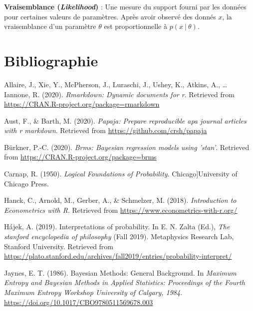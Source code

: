 \documentclass[
  a4paper,11pt,twoside,onecolumn,openright,final,oldfontcommands]{memoir}
\newlength{\cslhangindent}
\newenvironment{cslreferences}%
  {\setlength{\parindent}{0pt}%
  \everypar{\setlength{\hangindent}{\cslhangindent}}\ignorespaces}%
  {\par}
\theoremstyle{definition}
\theoremstyle{definition}
\theoremstyle{definition}
\theoremstyle{remark}
\begin{document}
\textbf{Vraisemblance (\emph{Likelihood})} : Une mesure du support fourni par les données pour certaines valeurs de paramètres. Après avoir observé des donnés \(x\), la vraisemblance d'un paramètre \(\theta\) est proportionnelle à \(p(x \ | \ \theta)\).

\hypertarget{bibliographie}{%
\chapter*{Bibliographie}\label{bibliographie}}


\setlength{\parindent}{-0.5in}
\setlength{\parskip}{8pt}

\hypertarget{refs}{}
\begin{cslreferences}
\leavevmode\hypertarget{ref-R-rmarkdown}{}%
Allaire, J., Xie, Y., McPherson, J., Luraschi, J., Ushey, K., Atkins, A., \ldots{} Iannone, R. (2020). \emph{Rmarkdown: Dynamic documents for r}. Retrieved from \url{https://CRAN.R-project.org/package=rmarkdown}

\leavevmode\hypertarget{ref-R-papaja}{}%
Aust, F., \& Barth, M. (2020). \emph{Papaja: Prepare reproducible apa journal articles with r markdown}. Retrieved from \url{https://github.com/crsh/papaja}

\leavevmode\hypertarget{ref-R-brms}{}%
Bürkner, P.-C. (2020). \emph{Brms: Bayesian regression models using 'stan'}. Retrieved from \url{https://CRAN.R-project.org/package=brms}

\leavevmode\hypertarget{ref-carnap_logical_1950}{}%
Carnap, R. (1950). \emph{Logical Foundations of Probability}. Chicago{]}University of Chicago Press.

\leavevmode\hypertarget{ref-hanck_introduction_2018}{}%
Hanck, C., Arnold, M., Gerber, A., \& Schmelzer, M. (2018). \emph{Introduction to Econometrics with R}. Retrieved from \url{https://www.econometrics-with-r.org/}

\leavevmode\hypertarget{ref-sep-probability-interpret}{}%
Hájek, A. (2019). Interpretations of probability. In E. N. Zalta (Ed.), \emph{The stanford encyclopedia of philosophy} (Fall 2019). Metaphysics Research Lab, Stanford University. Retrieved from \url{https://plato.stanford.edu/archives/fall2019/entries/probability-interpret/}

\leavevmode\hypertarget{ref-jaynes_bayesian_1986}{}%
Jaynes, E. T. (1986). Bayesian Methods: General Background. In \emph{Maximum Entropy and Bayesian Methods in Applied Statistics: Proceedings of the Fourth Maximum Entropy Workshop University of Calgary, 1984}. \url{https://doi.org/10.1017/CBO9780511569678.003}


\end{cslreferences}
\end{document}
